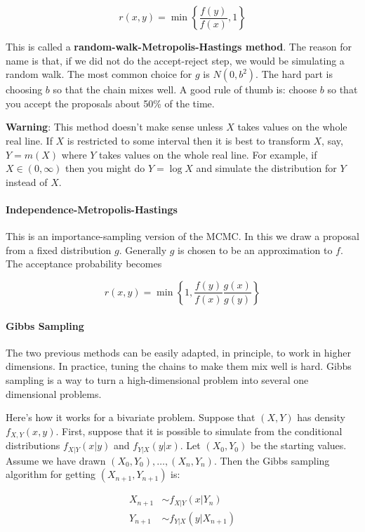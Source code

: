 \[ r(x, y) = \min \left\{ \frac{f(y)}{f(x)}, 1 \right\} \]

This is called a \textbf{random-walk-Metropolis-Hastings method}. The
reason for name is that, if we did not do the accept-reject step, we
would be simulating a random walk. The most common choice for \(g\) is
\(N(0, b^2)\). The hard part is choosing \(b\) so that the chain mixes
well. A good rule of thumb is: choose \(b\) so that you accept the
proposals about 50\% of the time.

\textbf{Warning}: This method doesn't make sense unless \(X\) takes
values on the whole real line. If \(X\) is restricted to some interval
then it is best to transform \(X\), say, \(Y = m(X)\) where \(Y\) takes
values on the whole real line. For example, if \(X \in (0, \infty)\)
then you might do \(Y = \log X\) and simulate the distribution for \(Y\)
instead of \(X\).

\paragraph{Independence-Metropolis-Hastings}\label{independence-metropolis-hastings}

This is an importance-sampling version of the MCMC. In this we draw a
proposal from a fixed distribution \(g\). Generally \(g\) is chosen to
be an approximation to \(f\). The acceptance probability becomes

\[ r(x, y) = \min \left\{ 1, \frac{f(y)}{f(x)} \frac{g(x)}{g(y)} \right\} \]

\paragraph{Gibbs Sampling}\label{gibbs-sampling}

The two previous methods can be easily adapted, in principle, to work in
higher dimensions. In practice, tuning the chains to make them mix well
is hard. Gibbs sampling is a way to turn a high-dimensional problem into
several one dimensional problems.

Here's how it works for a bivariate problem. Suppose that \((X, Y)\) has
density \(f_{X, Y}(x, y)\). First, suppose that it is possible to
simulate from the conditional distributions \(f_{X|Y}(x | y)\) and
\(f_{Y | X}(y | x)\). Let \((X_0, Y_0)\) be the starting values. Assume
we have drawn \((X_0, Y_0), \dots, (X_n, Y_n)\). Then the Gibbs sampling
algorithm for getting \((X_{n+1}, Y_{n+1})\) is:

\[
\begin{align}
X_{n + 1} &\sim f_{X|Y}(x | Y_n) \\
Y_{n + 1} &\sim f_{Y|X}(y | X_{n + 1})
\end{align}
\]


